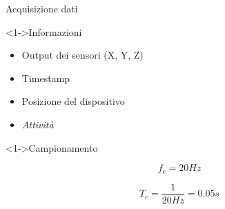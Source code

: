 \begin{tframe}{Acquisizione dati}

    \begin{block}<1->{Informazioni}

        \begin{itemize}
            \item Output dei sensori (X, Y, Z)
            \item Timestamp
            \item Posizione del dispositivo
            \item \textit{Attività}
        \end{itemize}
        
        \vspace{2mm}
    \end{block}

    \begin{block}<1->{Campionamento}
        \vspace{1mm}
        
        \begin{minipage}{0.45\textwidth}
            $$f_c = 20Hz$$
        \end{minipage}%
        \hfill
        \begin{minipage}{0.55\textwidth}
            $$T_c = \frac{1}{20Hz} = 0.05s$$
        \end{minipage}%
        
        \vspace{2mm}
    \end{block}

\end{tframe}